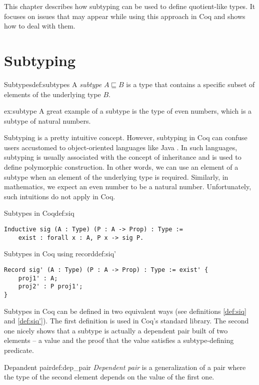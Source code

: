 This chapter describes how subtyping can be used to define quotient-like types. It focuses on issues that may appear while using this approach in Coq and shows how to deal with them.
\section{Subtyping}
\begin{defi}{Subtypes}{def:subtypes}
A \emph{subtype} $A \sqsubseteq B$ is a type that contains a specific subset of elements of the underlying type $B$.
\end{defi}
\begin{example}{}{ex:subtype}
A great example of a subtype is the type of even numbers, which is a subtype of natural numbers.
\end{example}
Subtyping is a pretty intuitive concept. However, subtyping in Coq can confuse users accustomed to object-oriented languages like Java \cite{Java}. In such languages, subtyping is usually associated with the concept of inheritance and is used to define polymorphic construction. In other words, we can use an element of a subtype when an element of the underlying type is required. Similarly, in mathematics, we expect an even number to be a natural number. Unfortunately, such intuitions do not apply in Coq.
\begin{defi}{Subtypes in Coq}{def:siq}
\begin{verbatim}
Inductive sig (A : Type) (P : A -> Prop) : Type :=
    exist : forall x : A, P x -> sig P.
\end{verbatim}
\end{defi}
\begin{defi}{Subtypes in Coq using record}{def:siq'}
\begin{verbatim}
Record sig' (A : Type) (P : A -> Prop) : Type := exist' {
    proj1' : A;
    proj2' : P proj1';
}
\end{verbatim}
\end{defi}
Subtypes in Coq can be defined in two equivalent ways (see definitions \ref{def:siq} and \ref{def:siq'}). The first definition is used in Coq's standard library. The second one nicely shows that a subtype is actually a dependent pair built of two elements -- a value and the proof that the value satisfies a subtype-defining predicate.
\begin{defi}{Depandent pair}{def:dep_pair}
\emph{Dependent pair} is a generalization of a pair where the type of the second element depends on the value of the first one.
\end{defi}
